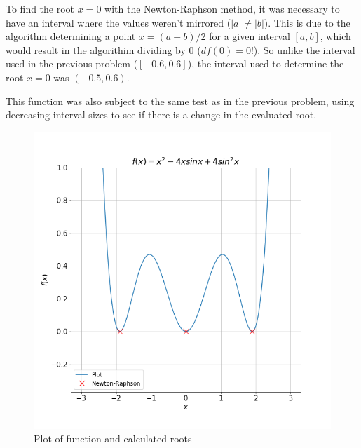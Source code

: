 \documentclass[twocolumn]{article}
\begin{document}
To find the root $x = 0$ with the Newton-Raphson method, it was necessary to have an interval where the values weren't mirrored ($|a|\neq |b|$). This
is due to the algorithm determining a point $x = (a + b)/2$ for a given interval $[a,b]$, which would result in the algorithim
dividing by $0$ ($df(0) = 0$!). So unlike the interval used in the previous problem ($[-0.6,0.6]$), the interval used to determine
the root $x=0$ was $(-0.5,0.6)$.

This function was also subject to the same test as in the previous problem, using decreasing interval sizes to see if there is a change in the evaluated root.

\begin{figure}[h!]
 \centering
 \includegraphics[scale = 0.4]{f4}
 \caption{Plot of function and calculated roots}
 \label{fig:f4}
\end{figure}

\vfill\eject
\end{document}
